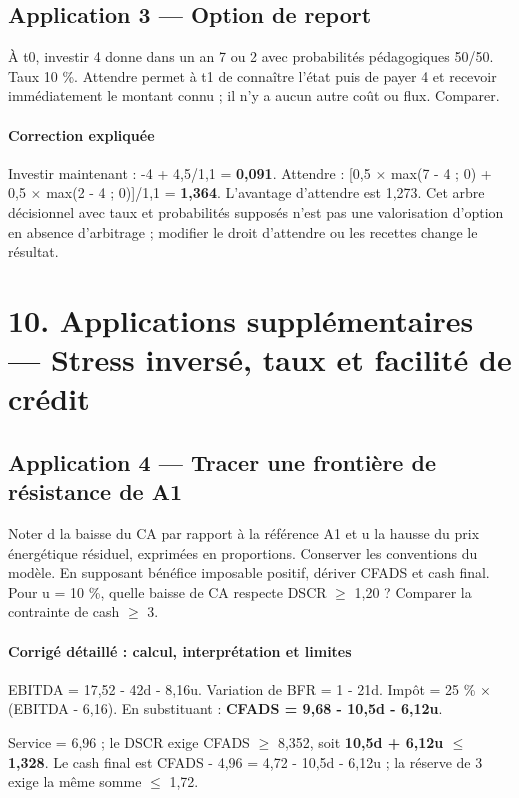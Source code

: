 \documentclass[12pt,a4paper]{article}
\begin{document}
\subsection*{Application 3 --- Option de report}
À t0, investir 4 donne dans un an 7 ou 2 avec probabilités pédagogiques 50/50. Taux 10 \%. Attendre permet à t1 de connaître l’état puis de payer 4 et recevoir immédiatement le montant connu ; il n’y a aucun autre coût ou flux. Comparer.


\paragraph{Correction expliquée}
Investir maintenant : -4 + 4,5/1,1 = \textbf{0,091}. Attendre : [0,5 $\times$ max(7 - 4 ; 0) + 0,5 $\times$ max(2 - 4 ; 0)]/1,1 = \textbf{1,364}. L’avantage d’attendre est 1,273. Cet arbre décisionnel avec taux et probabilités supposés n’est pas une valorisation d’option en absence d’arbitrage ; modifier le droit d’attendre ou les recettes change le résultat.

\section*{10. Applications supplémentaires --- Stress inversé, taux et facilité de crédit}

\subsection*{Application 4 --- Tracer une frontière de résistance de A1}
Noter d la baisse du CA par rapport à la référence A1 et u la hausse du prix énergétique résiduel, exprimées en proportions. Conserver les conventions du modèle. En supposant bénéfice imposable positif, dériver CFADS et cash final. Pour u = 10 \%, quelle baisse de CA respecte DSCR $\geq$ 1,20 ? Comparer la contrainte de cash $\geq$ 3.


\paragraph{Corrigé détaillé : calcul, interprétation et limites}
EBITDA = 17,52 - 42d - 8,16u. Variation de BFR = 1 - 21d. Impôt = 25 \% $\times$ (EBITDA - 6,16). En substituant : \textbf{CFADS = 9,68 - 10,5d - 6,12u}.

Service = 6,96 ; le DSCR exige CFADS $\geq$ 8,352, soit \textbf{10,5d + 6,12u $\leq$ 1,328}. Le cash final est CFADS - 4,96 = 4,72 - 10,5d - 6,12u ; la réserve de 3 exige la même somme $\leq$ 1,72.
\end{document}

